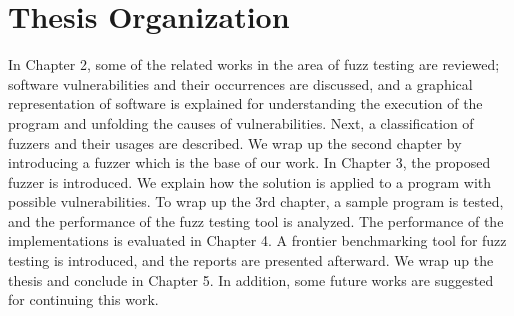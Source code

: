 \section{Thesis Organization}
\label{sec:1.3}

In Chapter 2, some of the related works in the area of fuzz testing are reviewed; software vulnerabilities and their occurrences are discussed, and a graphical representation of software is explained for understanding the execution of the program and unfolding the causes of vulnerabilities. Next, a classification of fuzzers and their usages are described. We wrap up the second chapter by introducing a fuzzer which is the base of our work. In Chapter 3, the proposed fuzzer is introduced. We explain how the solution is applied to a program with possible vulnerabilities. To wrap up the 3rd chapter, a sample program is tested, and the performance of the fuzz testing tool is analyzed. The performance of the implementations is evaluated in Chapter 4. A frontier benchmarking tool for fuzz testing is introduced, and the reports are presented afterward. We wrap up the thesis and conclude in Chapter 5. In addition, some future works are suggested for continuing this work.